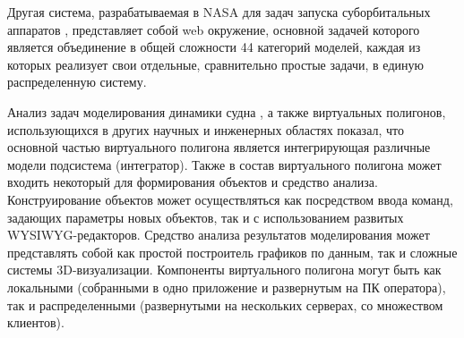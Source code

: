 Другая система, разрабатываемая в NASA для задач запуска суборбитальных аппаратов  \citep{vtb_ILRO},
представляет собой web окружение, основной задачей которого является объединение в общей сложности 44 категорий моделей, каждая из которых реализует свои отдельные, сравнительно простые задачи, в единую распределенную систему.




Анализ задач моделирования динамики судна \citep{nechaev_ai}, а также виртуальных полигонов, использующихся в других научных и инженерных областях показал, что основной частью виртуального полигона является интегрирующая различные модели подсистема (интегратор). Также в состав виртуального полигона может входить некоторый 
 для формирования объектов и средство анализа. Конструирование объектов может осуществляться как посредством ввода команд, задающих параметры новых объектов, так и с использованием развитых WYSIWYG-редакторов. Средство анализа результатов моделирования может представлять собой как простой построитель графиков по данным, так и сложные системы 3D-визуализации. Компоненты виртуального полигона могут быть как локальными (собранными в одно приложение и развернутым на ПК оператора), так и распределенными (развернутыми на нескольких серверах, со множеством клиентов).

